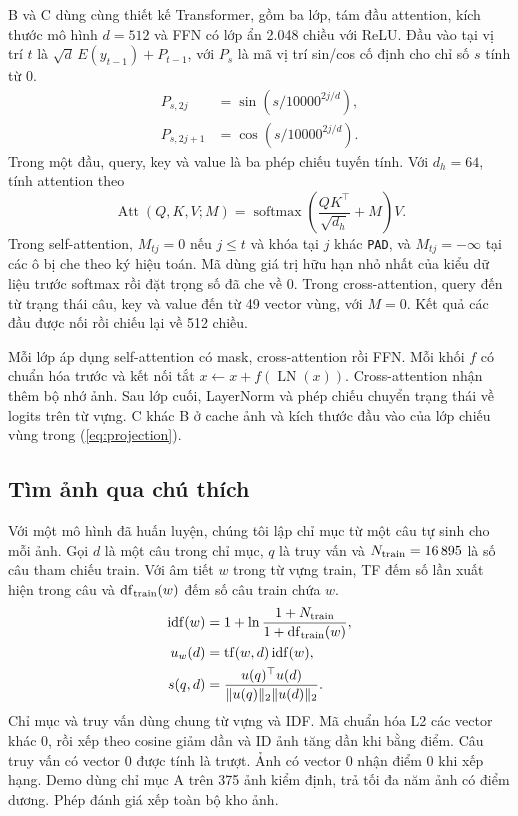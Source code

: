 \documentclass[a4paper,11pt]{article}
\newcommand{\modelA}{\textsc{A}}
\newcommand{\modelB}{\textsc{B}}
\newcommand{\modelC}{\textsc{C}}
\begin{document}
\modelB{} và \modelC{} dùng cùng thiết kế Transformer, gồm ba lớp, tám đầu attention, kích thước mô hình $d=512$ và FFN có lớp ẩn 2.048 chiều với ReLU. Đầu vào tại vị trí $t$ là $\sqrt d\,E(y_{t-1})+P_{t-1}$, với $P_s$ là mã vị trí sin/cos cố định cho chỉ số $s$ tính từ 0.
\begin{align}
  P_{s,2j}   &= \sin\!\left(s/10000^{2j/d}\right),\\
  P_{s,2j+1} &= \cos\!\left(s/10000^{2j/d}\right).
\end{align}
Trong một đầu, query, key và value là ba phép chiếu tuyến tính. Với $d_h=64$, tính attention theo
\begin{equation}
  \operatorname{Att}(Q,K,V;M)
  =\operatorname{softmax}\!\left(\frac{QK^\top}{\sqrt{d_h}}+M\right)V.
  \label{eq:dot}
\end{equation}
Trong self-attention, $M_{tj}=0$ nếu $j\le t$ và khóa tại $j$ khác \texttt{PAD}, và $M_{tj}=-\infty$ tại các ô bị che theo ký hiệu toán. Mã dùng giá trị hữu hạn nhỏ nhất của kiểu dữ liệu trước softmax rồi đặt trọng số đã che về 0. Trong cross-attention, query đến từ trạng thái câu, key và value đến từ 49 vector vùng, với $M=0$. Kết quả các đầu được nối rồi chiếu lại về 512 chiều.

Mỗi lớp áp dụng self-attention có mask, cross-attention rồi FFN. Mỗi khối $f$ có chuẩn hóa trước và kết nối tắt $x\leftarrow x+f(\operatorname{LN}(x))$. Cross-attention nhận thêm bộ nhớ ảnh. Sau lớp cuối, LayerNorm và phép chiếu chuyển trạng thái về logits trên từ vựng. \modelC{} khác \modelB{} ở cache ảnh và kích thước đầu vào của lớp chiếu vùng trong (\ref{eq:projection}).

\subsection{Tìm ảnh qua chú thích}

Với một mô hình đã huấn luyện, chúng tôi lập chỉ mục từ một câu tự sinh cho mỗi ảnh. Gọi $d$ là một câu trong chỉ mục, $q$ là truy vấn và $N_{\rm train}=16\,895$ là số câu tham chiếu train. Với âm tiết $w$ trong từ vựng train, TF đếm số lần xuất hiện trong câu và $\mathrm{df}_{\rm train}(w)$ đếm số câu train chứa $w$.
\begin{align}
  \mathrm{idf}(w)&=1+\ln\frac{1+N_{\rm train}}
                                  {1+\mathrm{df}_{\rm train}(w)},\\
  u_w(d)&=\mathrm{tf}(w,d)\,\mathrm{idf}(w),\\
  s(q,d)&=\frac{u(q)^\top u(d)}
                  {\lVert u(q)\rVert_2\lVert u(d)\rVert_2}.
  \label{eq:tfidf}
\end{align}
Chỉ mục và truy vấn dùng chung từ vựng và IDF. Mã chuẩn hóa L2 các vector khác 0, rồi xếp theo cosine giảm dần và ID ảnh tăng dần khi bằng điểm. Câu truy vấn có vector 0 được tính là trượt. Ảnh có vector 0 nhận điểm 0 khi xếp hạng. Demo dùng chỉ mục \modelA{} trên 375 ảnh kiểm định, trả tối đa năm ảnh có điểm dương. Phép đánh giá xếp toàn bộ kho ảnh.
\end{document}

